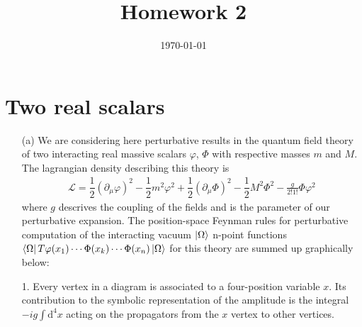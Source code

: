 \documentclass[10pt, a4paper]{article}
\title{Homework 2} %
\author{\PA} %
\date{\today} %
\begin{document}
\maketitlepage

\maketableofcontents

\section{Two real scalars}

\begin{enumerate}
    \item[(a)] We are considering here perturbative results in the quantum field theory of two interacting real massive scalars $\varphi$, $\Phi$ with respective masses $m$ and $M$. The lagrangian density describing this theory is 
    \begin{align*}
        \mathcal{L} = \dfrac{1}{2}(\partial_\mu \varphi)^2 - \dfrac{1}{2} m^2 \varphi^2  + \dfrac{1}{2}(\partial_\mu \Phi)^2 - \dfrac{1}{2} M^2 \Phi^2 - \frac{g}{2! 1!} \Phi \varphi^2
    \end{align*}
    where $g$ descrives the coupling of the fields and is the parameter of our perturbative expansion. The position-space Feynman rules for perturbative computation of the interacting vacuum $\ket{\Omega}$ n-point functions $\bra{\Omega}T\varphi(x_1) \cdots \Phi(x_k) \cdots  \Phi(x_n)\ket{\Omega}$ for this theory are summed up graphically below:\\[0.3cm]
    \begin{minipage}{0.45\textwidth}
        \begin{center}
        \end{center}
    1. Every vertex in a diagram is associated to a four-position variable $x$. Its contribution to the symbolic representation of the amplitude is the integral $-ig \int \text{d}^4x$ acting on the propagators from the $x$ vertex to other vertices. \\[0.3cm]

\end{minipage}
\end{enumerate}
\end{document}
